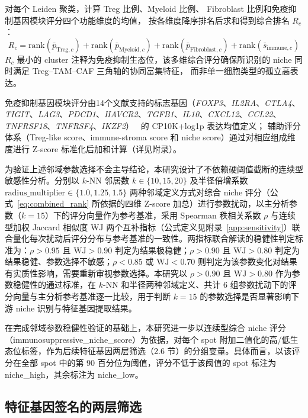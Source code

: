 \documentclass[12pt, a4paper]{ctexart}
\begin{document}
对每个 Leiden 聚类，计算 Treg 比例、Myeloid 比例、
Fibroblast 比例和免疫抑制基因模块评分四个功能维度的均值，
按各维度降序排名后求和得到综合排名 $R_c$：
\begin{equation}
R_c = \text{rank}(\bar{p}_{\text{Treg},c}) + \text{rank}(\bar{p}_{\text{Myeloid},c})
+ \text{rank}(\bar{p}_{\text{Fibroblast},c}) + \text{rank}(\bar{s}_{\text{immune},c})
\label{eq:combined_rank}
\end{equation}
$R_c$ 最小的 cluster 注释为免疫抑制生态位，该多维综合评分确保所识别的 niche 同时满足 Treg--TAM--CAF 三角轴的协同富集特征，
而非单一细胞类型的孤立高表达。

免疫抑制基因模块评分由14个文献支持的标志基因（\textit{FOXP3}、\textit{IL2RA}、\textit{CTLA4}、\textit{TIGIT}、\textit{LAG3}、\textit{PDCD1}、\textit{HAVCR2}、\textit{TGFB1}、\textit{IL10}、\textit{CXCL12}、\textit{CCL22}、\textit{TNFRSF18}、\textit{TNFRSF4}、\textit{IKZF2}）~\citep{sakaguchi2020regulatory,sharma2023immunosuppressive}
的 CP10K+log1p 表达均值定义；
辅助评分体系（Treg-like score、immune-stroma score 和 niche score）通过对相应组成维度进行 Z-score 标准化后加和计算（详见附录）。

为验证上述邻域参数选择不会主导结论，本研究设计了不依赖硬阈值截断的连续型敏感性分析。分别以 $k$-NN 邻居数 $k \in \{10, 15, 20\}$ 及半径倍增系数 $\text{radius\_multiplier} \in \{1.0, 1.25, 1.5\}$ 两种邻域定义方式对综合 niche 评分（公式~\ref{eq:combined_rank} 所依据的四维 Z-score 加总）进行参数扰动，以主分析参数（$k=15$）下的评分向量作为参考基准，采用 Spearman 秩相关系数 $\rho$ 与连续型加权 Jaccard 相似度 WJ 两个互补指标（公式定义见附录~\ref{app:sensitivity}）联合量化每次扰动后评分分布与参考基准的一致性。两指标联合解读的稳健性判定标准为：$\rho > 0.95$ 且 $\text{WJ} > 0.90$ 判定为结果极稳健；$\rho > 0.90$ 且 $\text{WJ} > 0.80$ 判定为结果稳健、参数选择不敏感；$\rho < 0.85$ 或 $\text{WJ} < 0.70$ 则判定为该参数变化对结果有实质性影响，需要重新审视参数选择。本研究以 $\rho > 0.90$ 且 $\text{WJ} > 0.80$ 作为参数稳健性的通过标准，在 $k$-NN 和半径两种邻域定义、共计 6 组参数扰动下的评分向量与主分析参考基准逐一比较，用于判断 $k=15$ 的参数选择是否显著影响下游 niche 识别与特征基因提取结果。

在完成邻域参数稳健性验证的基础上，本研究进一步以连续型综合 niche 评分（immunosuppressive\_niche\_score）为依据，对每个 spot 附加二值化的高/低生态位标签，作为后续特征基因两层筛选（2.6 节）的分组变量。具体而言，以该评分在全部 spot 中的第 90 百分位为阈值，评分不低于该阈值的 spot 标注为 niche\_high，其余标注为 niche\_low。

\subsection{特征基因签名的两层筛选}
\end{document}
